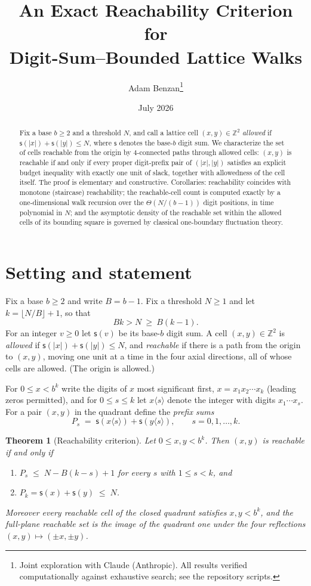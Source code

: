 \documentclass[11pt]{article}
\title{An Exact Reachability Criterion for\\ Digit-Sum--Bounded Lattice Walks}
\author{Adam Benzan\thanks{Joint exploration with Claude (Anthropic). All results
verified computationally against exhaustive search; see the repository scripts.}}
\date{July 2026}
\newtheorem{theorem}{Theorem}
\theoremstyle{remark}
\newcommand{\ds}{\mathsf{s}}
\newcommand{\pref}[2]{#1\langle #2\rangle}
\begin{document}
\maketitle

\begin{abstract}
Fix a base $b\ge 2$ and a threshold $N$, and call a lattice cell $(x,y)\in\mathbb{Z}^2$
\emph{allowed} if $\ds(|x|)+\ds(|y|)\le N$, where $\ds$ denotes the base-$b$ digit sum.
We characterize the set of cells reachable from the origin by $4$-connected paths
through allowed cells: $(x,y)$ is reachable if and only if every proper digit-prefix
pair of $(|x|,|y|)$ satisfies an explicit budget inequality with exactly one unit of
slack, together with allowedness of the cell itself. The proof is elementary and
constructive. Corollaries: reachability coincides with monotone (staircase)
reachability; the reachable-cell count is computed exactly by a one-dimensional
walk recursion over the $\Theta(N/(b-1))$ digit positions, in time polynomial
in $N$; and the asymptotic
density of the reachable set within the allowed cells of its bounding square
is governed by classical
one-boundary fluctuation theory.
\end{abstract}

\section{Setting and statement}

Fix a base $b\ge 2$ and write $B=b-1$. Fix a threshold $N\ge 1$ and let
$k=\lfloor N/B\rfloor+1$, so that
\begin{equation}\label{eq:krange}
Bk>N\ \ge\ B(k-1).
\end{equation}
For an integer $v\ge 0$ let $\ds(v)$ be its base-$b$ digit sum. A cell
$(x,y)\in\mathbb{Z}^2$ is \emph{allowed} if $\ds(|x|)+\ds(|y|)\le N$, and
\emph{reachable} if there is a path from the origin to $(x,y)$, moving one unit at a
time in the four axial directions, all of whose cells are allowed. (The origin is
allowed.)

For $0\le x<b^k$ write the digits of $x$ most significant first,
$x=x_1x_2\cdots x_k$ (leading zeros permitted), and for $0\le s\le k$ let
$\pref{x}{s}$ denote the integer with digits $x_1\cdots x_s$. For a pair $(x,y)$ in
the quadrant define the \emph{prefix sums}
\[
P_s \;=\; \ds(\pref{x}{s})+\ds(\pref{y}{s}), \qquad s=0,1,\dots,k .
\]

\begin{theorem}[Reachability criterion]\label{thm:main}
Let $0\le x,y<b^k$. Then $(x,y)$ is reachable if and only if
\begin{enumerate}
\item[\textup{(i)}] $P_s \;\le\; N-B(k-s)+1$ \quad for every $s$ with $1\le s<k$, and
\item[\textup{(ii)}] $P_k=\ds(x)+\ds(y)\;\le\; N$.
\end{enumerate}
Moreover every reachable cell of the closed quadrant satisfies $x,y<b^k$, and the
full-plane reachable set is the image of the quadrant one under the four
reflections $(x,y)\mapsto(\pm x,\pm y)$.
\end{theorem}
\end{document}
